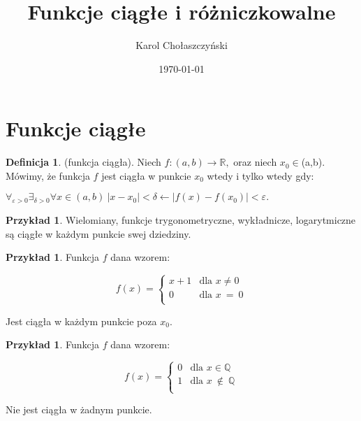 \documentclass[12pt,a4paper]{article}
\title{Funkcje ciągłe i różniczkowalne}
\date{\today}
\author{Karol Chołaszczyński}
\theoremstyle{definition}
\newtheorem{df}[tw]{Definicja}
\newtheorem{ex}[tw]{Przykład}
\begin{document}
 
\maketitle

\tableofcontents

\section{Funkcje ciągłe} 

\begin{df}
(funkcja ciągła). Niech 
$f:(a,b) \to \mathbb{R},$
oraz niech
$x_{0}\in$(a,b). Mówimy, że funkcja $f$ jest ciągła w punkcie $x_{0}$ wtedy i tylko wtedy gdy:

\begin{center}
$\forall_{\varepsilon>0}\exists_{\delta>0} \forall x\in(a,b)\ |x-x_{0}|<\delta\leftarrow|f(x)-f(x_{0})|<\varepsilon.$ 
\end{center}
\end{df}
\begin{ex}
Wielomiany, funkcje trygonometryczne, wykładnicze, logarytmiczne są ciągłe w każdym punkcie swej dziedziny.
\end{ex}
\begin{ex}
Funkcja $f$ dana wzorem:
\begin{center}
\begin{displaymath}
f(x)= \left\{ \begin{array}{ll}
x+1 & \textrm{dla $x \neq 0$}\\
0 & \textrm{dla $x\ =\ 0$}\\
\end{array} \right.
\end{displaymath}
\end{center}
Jest ciągła w każdym punkcie poza $x_0$.
\end{ex}
\begin{ex}
Funkcja $f$ dana wzorem:
\begin{center}
\begin{displaymath}
f(x)= \left\{ \begin{array}{ll}
0 & \textrm{dla $x \in \mathbb{Q}$}\\
1 & \textrm{dla $x\ \notin\ \mathbb{Q}$}\\
\end{array} \right.
\end{displaymath}
\end{center}
Nie jest ciągła w żadnym punkcie.
\\
\end{ex}
\end{document}
